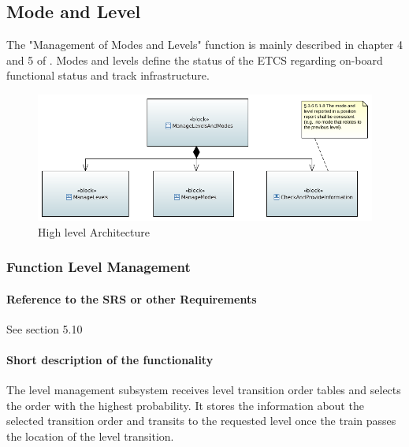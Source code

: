 
\subsection{Mode and Level}


The "Management of Modes and Levels" function is mainly described in chapter 4 and 5 of \citep{subset-026}. Modes and levels define the status of the ETCS
regarding on-board functional status and track infrastructure.

\begin{figure}
\centering
\includegraphics[width=\textwidth]{images/FunctionalArchitecture.png}
\caption{High level Architecture}
\end{figure}

\subsubsection{Function Level Management}%

\paragraph{Reference to the SRS or other Requirements}
See \citep{subset-026} section 5.10

\paragraph{Short description of the functionality}
The level management subsystem receives level transition order tables and selects the order with the highest probability. It stores the information about the selected transition order and transits to the requested level once the train passes the location of the level transition.

